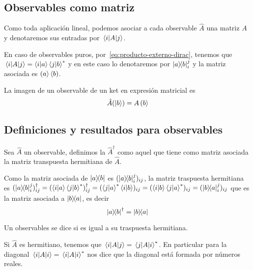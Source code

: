 \subsection{Observables como matriz}\label{subsec:observables-como-matriz}
Como toda aplicación lineal, podemos asociar a cada observable $\hat{A}$ una matriz $A$ y denotaremos sus entradas por $\matrixelement{i}{A}{j}$.

En caso de observables puros, por~\eqref{eq:producto-externo-dirac}, tenemos que $\matrixelement{i}{A}{j}=\braket{i}{a}\braket{j}{b}^*$ y en este caso lo denotaremos por $\ketbra{a}{b}_{i}^{j}$ y la matriz asociada es $\left(a\right>\left<b\right)$.

La imagen de un observable de un ket en expresión matricial es
\begin{equation}
	\label{eq:imagen-observable-ket-matriz}
	\hat{A}(\ket{b})=A\left(b\right>
\end{equation}

\subsection{Definiciones y resultados para observables}\label{subsec:definiciones-y-resultados-para-observables}

\begin{definition}
	Sea $\hat{A}$ un observable, definimos la  $\hat{A}^\dag$ como aquel que tiene como matriz asociada la matriz transpuesta hermitiana de $\hat{A}$.
\end{definition}

Como la matriz asociada de $\ketbra{a}{b}$ es $(\ketbra{a}{b}_{i}^{j})_{ij}$, la matriz traspuesta hermitiana es $(\ketbra{a}{b}_{i}^{j})_{ij}^\dag = (\braket{i}{a}\braket{j}{b}^*)_{ij}^\dag=(\braket{j}{a}^*\braket{i}{b})_{ij}=(\braket{i}{b}\braket{j}{a}^*)_{ij}=(\ketbra{b}{a}_{i}^{j})_{ij}$ que es la matriz asociada a $\ketbra{b}{a}$, es decir
\begin{equation}
	\label{eq:traspuesta-hermitiana-producto-externo}
	\ketbra{a}{b}^\dag = \ketbra{b}{a}
\end{equation}

\begin{definition}
	Un observables se dice  si es igual a su traspuesta hermitiana.
\end{definition}

Si $\hat{A}$ es hermitiano, tenemos que $\matrixelement{i}{A}{j}=\matrixelement{j}{A}{i}^*$.
En particular para la diagonal $\matrixelement{i}{A}{i}=\matrixelement{i}{A}{i}^*$ nos dice que la diagonal está formada por números reales.

